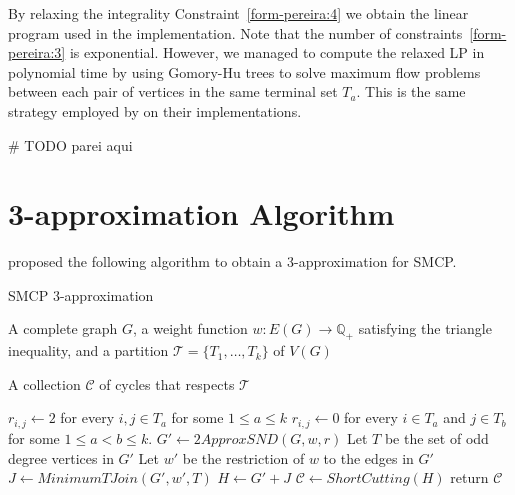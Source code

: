 By relaxing the integrality Constraint~\eqref{form-pereira:4} we obtain the linear program used in the implementation. Note that the number of constraints~\eqref{form-pereira:3} is exponential. However, we managed to compute the relaxed LP in polynomial time by using Gomory-Hu trees to solve maximum flow problems between each pair of vertices in the same terminal set \(T_a\). This is the same strategy employed by \cite{Pereira2018TheSM} on their implementations.

# TODO parei aqui

\section{3-approximation Algorithm}

\cite{smcp_3apx} proposed the following algorithm to obtain a 3-approximation for SMCP.

\begin{algorithm}
\caption{SMCP 3-approximation}
\label{algorithm:smcp-3-apx}
\begin{algorithmic}[1]

\Require A complete graph \(G\), a weight function \(w: E(G) \rightarrow \mathbb{Q}_+\) satisfying the triangle inequality, and a partition \(\mathcal{T} = \{T_1, \dots, T_k\}\) of \(V(G)\)

\Ensure A collection \(\mathcal{C}\) of cycles that respects \(\mathcal{T}\)

\State \(r_{i, j} \gets 2\) for every \(i, j \in T_a\) for some \(1 \leq a \leq  k\)
\State \(r_{i, j} \gets 0\) for every \(i \in T_a\) and \(j \in T_b\) for some \(1 \leq a < b \leq k\).
\State \(G' \gets 2ApproxSND(G, w, r)\) \label{alg:3-apx:snd-2-apx}
\State Let \(T\) be the set of odd degree vertices in \(G'\)
\State Let \(w'\) be the restriction of \(w\) to the edges in \(G'\)
\State \(J \gets MinimumTJoin(G', w', T)\) \label{alg:3-apx:t-join}
\State \(H \gets G' + J\)
\State \(\mathcal{C} \gets ShortCutting(H)\) \label{alg:3-apx:shortcutting}
\State return \(\mathcal{C}\)


\end{algorithmic}
\end{algorithm}




